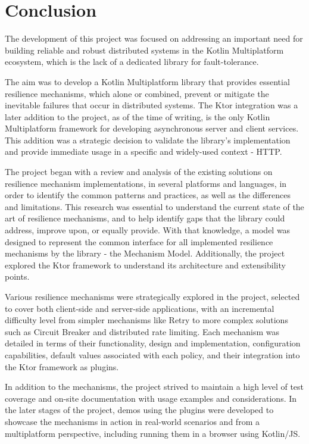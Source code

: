 \chapter{Conclusion}\label{ch:conclusion}

The development of this project was focused
on addressing an important need
for building reliable and robust distributed systems in the Kotlin Multiplatform ecosystem, which is the lack of a dedicated library for fault-tolerance.

The aim was to develop a Kotlin Multiplatform library
that provides essential resilience mechanisms, which alone or combined, prevent or mitigate the inevitable failures that occur in distributed systems.
The Ktor integration was a later addition to the project, as of the time of writing,
is the only Kotlin Multiplatform framework for developing asynchronous server and client services.
This addition was a strategic decision to validate the library's implementation and provide immediate usage in a specific and widely-used context - HTTP.

The project began with a review and analysis
of the existing solutions on resilience mechanism implementations,
in several platforms and languages,
in order to identify the common patterns and practices, as well as the differences and limitations.
This research was essential to understand the current state of the art of resilience mechanisms,
and to help identify gaps that the library could address, improve upon, or equally provide.
With that knowledge,
a model was designed to represent the common interface for all implemented resilience mechanisms by the library -
the Mechanism Model.
Additionally, the project explored the Ktor framework to understand its architecture and extensibility points.

Various resilience mechanisms were strategically explored in the project,
selected to cover both client-side and server-side applications,
with an incremental difficulty level from simpler mechanisms like Retry to more complex solutions such as Circuit Breaker and distributed rate limiting.
Each mechanism was detailed in terms of their functionality, design and implementation, configuration capabilities, default values associated with each policy, and their integration into the Ktor framework as plugins.

In addition to the mechanisms,
the project strived
to maintain a high level of test coverage and on-site documentation with usage examples and considerations.
In the later stages of the project,
demos using the plugins were developed
to showcase the mechanisms in action in real-world scenarios and from a multiplatform perspective,
including running them in a browser using Kotlin/JS.

